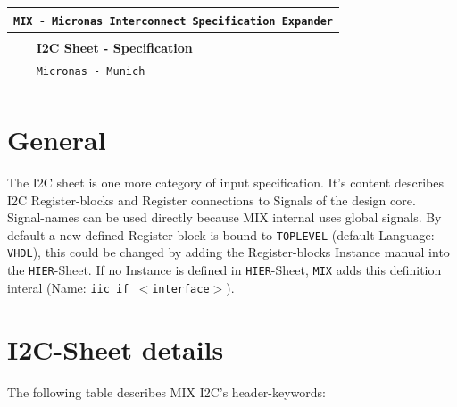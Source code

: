 \documentclass[a4paper,12pt]{report}
\begin{document}
\begin{titlepage}
\vspace*{70mm}
\centering
\begin{tabular}{p{20mm}l}
\multicolumn{2}{r}{\tt {MIX} - Micronas Interconnect Specification Expander}\\[1mm]
\hline \\[3mm]
&{\bf I2C Sheet - Specification}\\[5mm]
&{\tt Micronas - Munich}\\[5mm]
\hline \\[20mm]
\end{tabular}
\end{titlepage}


\raggedright

\section{General}
The I2C sheet is one more category of input specification. It's content describes I2C Register-blocks and Register connections to Signals of the design core. Signal-names can be used directly because MIX internal uses global signals. By default a new defined Register-block is bound to {\tt TOPLEVEL} (default Language: {\tt VHDL}), this could be changed by adding the Register-blocks Instance manual into the {\tt HIER}-Sheet. If no Instance is defined in {\tt HIER}-Sheet, {\tt MIX} adds this definition interal (Name: {\tt iic\_if\_$<$interface$>$}).

\section{I2C-Sheet details}
The following table describes MIX I2C's header-keywords:
\end{document}
